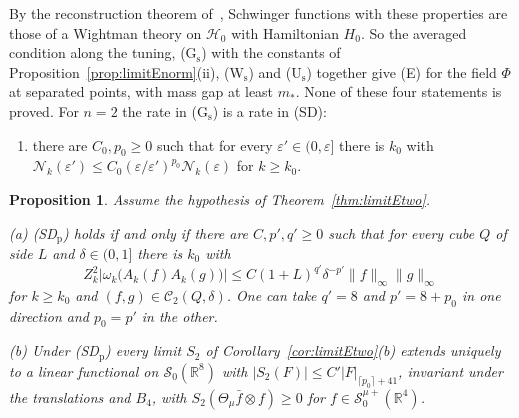 \documentclass[aps,prd,twocolumn,superscriptaddress,nofootinbib,longbibliography,floatfix,amsmath,amssymb,10pt]{revtex4-2}
\newtheorem{proposition}[theorem]{Proposition}
\theoremstyle{definition}
\theoremstyle{remark}
\newcommand{\R}{\mathbb{R}}
\begin{document}
By the reconstruction theorem of~\cite{OS75}, Schwinger functions with these
properties are those of a Wightman theory on $\mathcal H_0$ with Hamiltonian
$H_0$. So the averaged condition along the tuning, (G$_{\mathrm s}$) with the
constants of Proposition~\ref{prop:limitEnorm}(ii), (W$_{\mathrm s}$) and
(U$_{\mathrm s}$) together give (E) for the field $\Phi$ at separated points,
with mass gap at least $m_*$. None of these four statements is proved. For
$n=2$ the rate in (G$_{\mathrm s}$) is a rate in (SD):
\begin{enumerate}[label=\textup{(SD$_{\mathrm p}$)},leftmargin=*]
\item there are $C_0,p_0\ge0$ such that for every $\varepsilon'\in(0,
\varepsilon]$ there is $k_0$ with $\mathcal N_k(\varepsilon')\le C_0(
\varepsilon/\varepsilon')^{p_0}\mathcal N_k(\varepsilon)$ for $k\ge k_0$.
\end{enumerate}

\begin{proposition}\label{prop:limitEtwotempered}
Assume the hypothesis of Theorem~\textup{\ref{thm:limitEtwo}}.

\textup{(a)} \textup{(SD$_{\mathrm p}$)} holds if and only if there are
$C,p',q'\ge0$ such that for every cube $Q$ of side $L$ and $\delta\in(0,1]$
there is $k_0$ with
\[
Z_k^2\bigl|\omega_k\bigl(A_k(f)A_k(g)\bigr)\bigr|\le C(1+L)^{q'}\delta^{-p'}
\|f\|_\infty\|g\|_\infty
\]
for $k\ge k_0$ and $(f,g)\in\mathcal C_2(Q,\delta)$. One can take $q'=8$ and
$p'=8+p_0$ in one direction and $p_0=p'$ in the other.

\textup{(b)} Under \textup{(SD$_{\mathrm p}$)} every limit $S_2$ of
Corollary~\textup{\ref{cor:limitEtwo}(b)} extends uniquely to a linear
functional on $\mathcal S_0(\R^8)$ with $|S_2(F)|\le C'|F|_{\lceil p_0\rceil
+41}$, invariant under the translations and $B_4$, with
$S_2(\Theta_\mu\bar f\otimes f)\ge0$ for $f\in\mathcal S^{\mu+}_0(\R^4)$.
\end{proposition}
\end{document}
